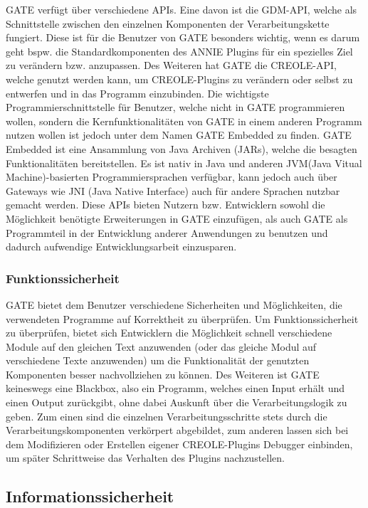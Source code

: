 \documentclass[12pt]{report}
\begin{document}
GATE verfügt über verschiedene APIs. Eine davon ist die GDM-API, welche als Schnittstelle zwischen den einzelnen Komponenten der Verarbeitungskette fungiert. Diese ist für die Benutzer von GATE besonders wichtig, wenn es darum geht bspw. die Standardkomponenten des ANNIE Plugins für ein spezielles Ziel zu verändern bzw. anzupassen. Des Weiteren hat GATE die CREOLE-API, welche genutzt werden kann, um CREOLE-Plugins zu verändern oder selbst zu entwerfen und in das Programm einzubinden.
Die wichtigste Programmierschnittstelle für Benutzer, welche nicht in GATE programmieren wollen, sondern die Kernfunktionalitäten von GATE in einem anderen Programm nutzen wollen ist jedoch unter dem Namen GATE Embedded zu finden. GATE Embedded ist eine Ansammlung von Java Archiven (JARs), welche die besagten Funktionalitäten bereitstellen. Es ist nativ in Java und anderen JVM(Java Vitual Machine)-basierten Programmiersprachen verfügbar, kann jedoch auch über Gateways wie JNI (Java Native Interface) auch für andere Sprachen nutzbar gemacht werden.
Diese APIs bieten Nutzern bzw. Entwicklern sowohl die Möglichkeit benötigte Erweiterungen in GATE einzufügen, als auch GATE als Programmteil in der Entwicklung anderer Anwendungen zu benutzen und dadurch aufwendige Entwicklungsarbeit einzusparen. 

\subsubsection{Funktionssicherheit}
GATE bietet dem Benutzer verschiedene Sicherheiten und Möglichkeiten, die verwendeten Programme auf Korrektheit zu überprüfen. 
Um Funktionssicherheit zu überprüfen, bietet sich Entwicklern die Möglichkeit schnell verschiedene Module auf den gleichen Text anzuwenden (oder das gleiche Modul auf verschiedene Texte anzuwenden) um die Funktionalität der genutzten Komponenten besser nachvollziehen zu können. Des Weiteren ist GATE keineswegs eine Blackbox, also ein Programm, welches einen Input erhält und einen Output zurückgibt, ohne dabei Auskunft über die Verarbeitungslogik zu geben. Zum einen sind die einzelnen Verarbeitungsschritte stets durch die Verarbeitungskomponenten verkörpert abgebildet, zum anderen lassen sich bei dem Modifizieren oder Erstellen eigener CREOLE-Plugins Debugger einbinden, um später Schrittweise das Verhalten des Plugins nachzustellen.

\subsection{Informationssicherheit}
\end{document}
